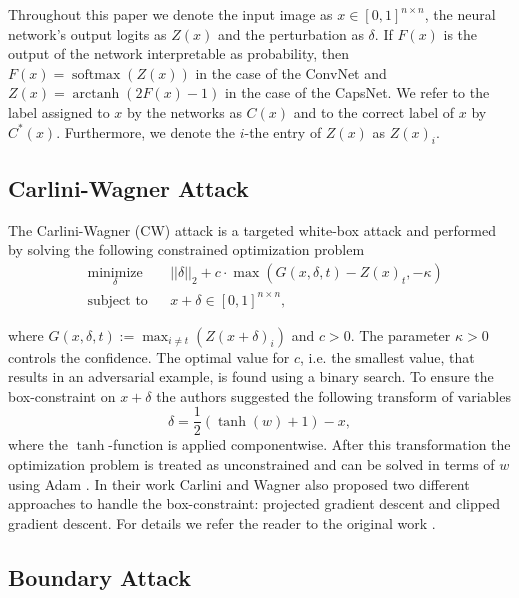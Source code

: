 \documentclass{article}
\DeclareMathOperator\arctanh{arctanh}
\DeclareMathOperator\softmax{softmax}
\begin{document}
Throughout this paper we denote the input image as $x\in [0,1]^{n\times n}$, the neural network's output logits as $Z(x)$ and the perturbation as $\delta$. If $F(x)$ is the output of the network interpretable as probability, then
$F(x) = \softmax (Z(x))$ in the case of the ConvNet and $Z(x) = \arctanh(2F(x) - 1)$ in the case of the CapsNet. We refer to the label assigned to $x$ by the networks as $C(x)$  and to the correct label of $x$ by $C^*(x)$. Furthermore, we denote the $i$-the entry of $Z(x)$ as $Z(x)_i$.

\subsection{Carlini-Wagner Attack}

The Carlini-Wagner (CW) attack  is a targeted white-box attack and performed by solving the following constrained optimization problem
\begin{equation}
\begin{aligned}
& \underset{\delta}{\text{minimize}}
& & ||\delta||_2 + c \cdot \max(G(x,\delta,t)-Z(x)_t, -\kappa) \\
& \text{subject to}
& & x+\delta \in [0,1]^{n \times n},
\end{aligned}
\end{equation}

where $G(x,\delta,t) := \max_{i\neq t}(Z(x+\delta)_i)$ and $c>0$. The parameter  $\kappa > 0$ controls the confidence. The optimal value for $c$, i.e. the smallest value, that results in an adversarial example, is found using a binary search. To ensure the box-constraint on $x+\delta$ the authors suggested the following transform of variables 
\begin{equation}
\delta = \frac{1}{2}(\tanh(w)+1)-x,
\end{equation} 
where the $\tanh$-function is applied componentwise. After this transformation the optimization problem is treated as unconstrained and can be solved in terms of $w$ using Adam \cite{adam}. In their work Carlini and Wagner also proposed two different approaches to handle the box-constraint: projected gradient descent and clipped gradient descent. For details we refer the reader to the original work \cite{carlini}.

\subsection{Boundary Attack}
\end{document}
